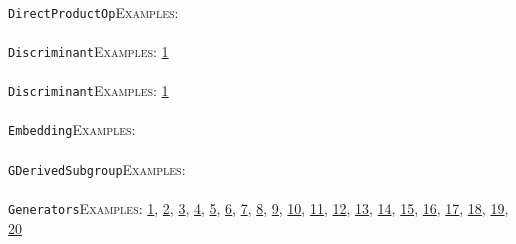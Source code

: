 \documentclass[a4paper,11pt]{report}
\begin{document}
{{ \\
 \texttt{DirectProductOp}{\nobreakspace}{\nobreakspace}{\nobreakspace}{\nobreakspace}\textsc{Examples:} \\
 \\
 \texttt{Discriminant}{\nobreakspace}{\nobreakspace}{\nobreakspace}{\nobreakspace}\textsc{Examples:} \href{tutorial/chap10.html} {1}{\nobreakspace} \\
 \\
 \texttt{Discriminant}{\nobreakspace}{\nobreakspace}{\nobreakspace}{\nobreakspace}\textsc{Examples:} \href{tutorial/chap10.html} {1}{\nobreakspace} \\
 \\
 \texttt{Embedding}{\nobreakspace}{\nobreakspace}{\nobreakspace}{\nobreakspace}\textsc{Examples:} \\
 \\
 \texttt{GDerivedSubgroup}{\nobreakspace}{\nobreakspace}{\nobreakspace}{\nobreakspace}\textsc{Examples:} \\
 \\
 \texttt{Generators}{\nobreakspace}{\nobreakspace}{\nobreakspace}{\nobreakspace}\textsc{Examples:} \href{tutorial/chap3.html} {1}{\nobreakspace}, \href{tutorial/chap7.html} {2}{\nobreakspace}, \href{tutorial/chap8.html} {3}{\nobreakspace}, \href{tutorial/chap10.html} {4}{\nobreakspace}, \href{../www/SideLinks/About/aboutModPRings.html} {5}{\nobreakspace}, \href{../www/SideLinks/About/aboutParallel.html} {6}{\nobreakspace}, \href{../www/SideLinks/About/aboutBredon.html} {7}{\nobreakspace}, \href{../www/SideLinks/About/aboutPerformance.html} {8}{\nobreakspace}, \href{../www/SideLinks/About/aboutPeriodic.html} {9}{\nobreakspace}, \href{../www/SideLinks/About/aboutCohomologyRings.html} {10}{\nobreakspace}, \href{../www/SideLinks/About/aboutCoveringSpaces.html} {11}{\nobreakspace}, \href{../www/SideLinks/About/aboutCoverinSpaces.html} {12}{\nobreakspace}, \href{../www/SideLinks/About/aboutRandomComplexes.html} {13}{\nobreakspace}, \href{../www/SideLinks/About/aboutExtensions.html} {14}{\nobreakspace}, \href{../www/SideLinks/About/aboutSpaceGroup.html} {15}{\nobreakspace}, \href{../www/SideLinks/About/aboutFunctorial.html} {16}{\nobreakspace}, \href{../www/SideLinks/About/aboutIntro.html} {17}{\nobreakspace}, \href{../www/SideLinks/About/aboutTopology.html} {18}{\nobreakspace}, \href{../www/SideLinks/About/aboutTorAndExt.html} {19}{\nobreakspace}, \href{../www/SideLinks/About/aboutTwistedCoefficients.html} {20}{\nobreakspace} \\
 \\
}}
\end{document}
